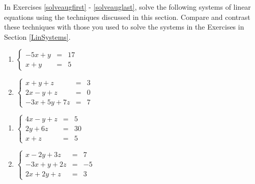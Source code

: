 In Exercises \ref{solveaugfirst} - \ref{solveauglast}, solve the following systems of linear equations using the techniques discussed in this section.  Compare and contrast these techniques with those you used to solve the systems in the Exercises in Section \ref{LinSystems}.

\begin{multicols}{2}
\begin{enumerate}
\setcounter{enumi}{\value{HW}}


\item $\left\{ \begin{array}{rcr} -5x + y & = & 17  \\ x + y & = & 5  \end{array} \right.$ \label{solveaugfirst}
\item $\left\{ \begin{array}{rcr} x + y + z & = & 3 \\ 2x - y + z & = & 0 \\ -3x + 5y + 7z & = & 7  \end{array} \right.$

\setcounter{HW}{\value{enumi}}
\end{enumerate}
\end{multicols}


\begin{multicols}{2}
\begin{enumerate}
\setcounter{enumi}{\value{HW}}


\item $\left\{ \begin{array}{rcr} 4x - y + z & = & 5 \\ 2y + 6z & = & 30 \\ x + z & = & 5  \end{array} \right.$

\item $\left\{ \begin{array}{rcr} x-2y+3z & = & 7 \\ -3x+y+2z & = & -5 \\ 2x+2y+z & = & 3  \end{array} \right.$

\setcounter{HW}{\value{enumi}}
\end{enumerate}
\end{multicols}


